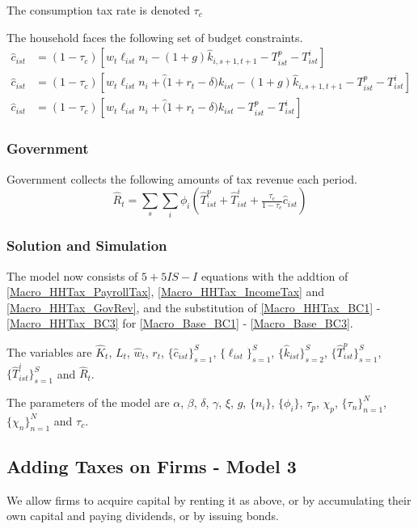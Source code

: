 \documentclass[letterpaper,12pt]{article}
\theoremstyle{definition}
\numberwithin{equation}{section}
\begin{document}
\begin{spacing}{1.5}
      The consumption tax rate is denoted $\tau_c$

      The household faces the following set of budget constraints.
      \begin{align}
      \hat c_{ist} & = (1-\tau_c)\left[w_t \ell_{ist} n_i - (1+g) \hat k_{i,s+1,t+1} - T^p_{ist} - T^i_{ist} \right] \label{Macro_HHTax_BC1}\\
      \hat c_{ist} & = (1-\tau_c)\left[w_t \ell_{ist} n_i + \hat (1+r_t-\delta) k_{ist} - (1+g)\hat k_{i,s+1,t+1} - T^p_{ist} - T^i_{ist} \right] \label{Macro_HHTax_BC2}\\
      \hat c_{ist} & = (1-\tau_c)\left[w_t \ell_{ist} n_i + \hat (1+r_t-\delta) k_{ist} - T^p_{ist} - T^i_{ist} \right] \label{Macro_HHTax_BC3}
      \end{align}

    \subsubsection{Government}
      Government collects the following amounts of tax revenue each period.
      \begin{equation} \label{Macro_HHTax_GovRev}
      \hat R_t = \sum_s \sum_i \phi_i \left( \hat T^p_{ist} + \hat T^i_{ist} + \tfrac{\tau_c}{1-\tau_c} \hat c_{ist} \right)
      \end{equation}

    \subsubsection{Solution and Simulation}
      The model now consists of $5 + 5IS - I$ equations with the addtion of \eqref{Macro_HHTax_PayrollTax}, \eqref{Macro_HHTax_IncomeTax} and \eqref{Macro_HHTax_GovRev}, and the substitution of \eqref{Macro_HHTax_BC1} - \eqref{Macro_HHTax_BC3} for \eqref{Macro_Base_BC1} - \eqref{Macro_Base_BC3}.

      The variables are $\hat K_t$, $L_t$, $\hat w_t$, $r_t$, $\{\hat c_{ist}\}_{s=1}^S$, $\{\ell_{ist}\}_{s=1}^S$, $\{\hat k_{ist}\}_{s=2}^S$, $\{\hat T^p_{ist}\}_{s=1}^S$, $\{\hat T^i_{ist}\}_{s=1}^S$ and $\hat R_t$.

      The parameters of the model are $\alpha$, $\beta$, $\delta$, $\gamma$, $\xi$, $g$, $\{n_i\}$, $\{\phi_i\}$, $\tau_p$, $\chi_p$, $\{\tau_n\}_{n=1}^N$, $\{\chi_n\}_{n=1}^N$ and $\tau_c$.

    \newpage

  \subsection{Adding Taxes on Firms - Model 3}\label{SubSec_Macro_CorpTax}
    We allow firms to acquire capital by renting it as above, or by accumulating their own capital and paying dividends, or by issuing bonds.


\end{spacing}
\end{document}
